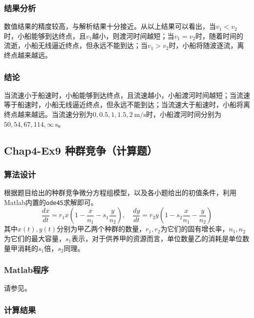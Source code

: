 \documentclass[12pt,a4paper]{article}
\begin{document}
\subsubsection{结果分析}

数值结果的精度较高，与解析结果十分接近。从以上结果可以看出，当$v_1 < v_2$时，小船能够到达终点，且$v_1$越小，则渡河时间越短；当$v_1 = v_2$时，随着时间的流逝，小船无线逼近终点，但永远不能到达；当$v_1 > v_2$时，小船将随波逐流，离终点越来越远。

\subsubsection{结论}

当流速小于船速时，小船能够到达终点，且流速越小，小船渡河时间越短；当流速等于船速时，小船无线逼近终点，但永远不能到达；当流速大于船速时，小船将离终点越来越远。当流速分别为$0,0.5,1,1.5,2\ \mathrm{m/s}$时，小船渡河时间分别为$50,54,67,114,\infty\ \mathrm{s}$。

\subsection{Chap4-Ex9 种群竞争（计算题）}

\subsubsection{算法设计}

根据题目给出的种群竞争微分方程组模型，以及各小题给出的初值条件，利用Matlab内置的\texttt{ode45}求解即可。
\begin{equation}\label{eq:ex9_model}
    \frac{dx}{dt} = r_1x\left(1-\frac{x}{n_1}-s_1\frac{y}{n_2}\right), \quad
    \frac{dy}{dt} = r_2y\left(1-s_2\frac{x}{n_1}-\frac{y}{n_2}\right)
\end{equation}
其中$x(t),y(t)$分别为甲乙两个种群的数量，$r_1, r_2$为它们的固有增长率，$n_1, n_2$为它们的最大容量，$s_1$表示，对于供养甲的资源而言，单位数量乙的消耗是单位数量甲消耗的$s_1$倍，$s_2$同理。

\subsubsection{Matlab程序}

请参见。

\subsubsection{计算结果}
\end{document}
